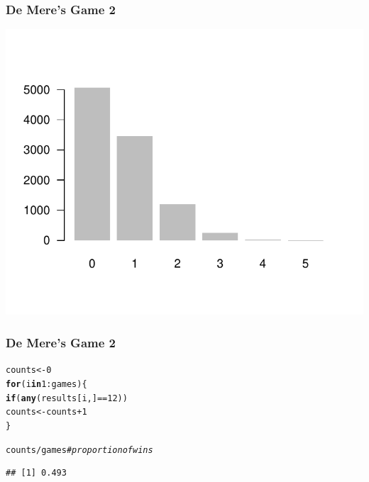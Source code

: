 \documentclass[12pt]{beamer}\usepackage[]{graphicx}\usepackage[]{color}
\makeatletter
\newcommand{\hlnum}[1]{\textcolor[rgb]{0.686,0.059,0.569}{#1}}%
\newcommand{\hlcom}[1]{\textcolor[rgb]{0.678,0.584,0.686}{\textit{#1}}}%
\newcommand{\hlopt}[1]{\textcolor[rgb]{0,0,0}{#1}}%
\newcommand{\hlstd}[1]{\textcolor[rgb]{0.345,0.345,0.345}{#1}}%
\newcommand{\hlkwa}[1]{\textcolor[rgb]{0.161,0.373,0.58}{\textbf{#1}}}%
\newcommand{\hlkwb}[1]{\textcolor[rgb]{0.69,0.353,0.396}{#1}}%
\newcommand{\hlkwd}[1]{\textcolor[rgb]{0.737,0.353,0.396}{\textbf{#1}}}%
\newenvironment{kframe}{%
 \def\at@end@of@kframe{}%
 \ifinner\ifhmode%
  \def\at@end@of@kframe{\end{minipage}}%
  \begin{minipage}{\columnwidth}%
 \fi\fi%
 \def\FrameCommand##1{\hskip\@totalleftmargin \hskip-\fboxsep
 \colorbox{shadecolor}{##1}\hskip-\fboxsep
     \hskip-\linewidth \hskip-\@totalleftmargin \hskip\columnwidth}%
 \MakeFramed {\advance\hsize-\width
   \@totalleftmargin\z@ \linewidth\hsize
   \@setminipage}}%
 {\par\unskip\endMakeFramed%
 \at@end@of@kframe}
\newenvironment{knitrout}{}{} %
\makeatother
\begin{document}
\begin{frame}[fragile]
\frametitle{De Mere's Game 2}

\begin{knitrout}\footnotesize
{}\color{fgcolor}

{\centering \includegraphics[width=.7\linewidth,height=.6\linewidth]{figure/unnamed-chunk-46-1} 

}



\end{knitrout}

\end{frame}


\begin{frame}[fragile]
\frametitle{De Mere's Game 2}

\begin{knitrout}\footnotesize
{}\color{fgcolor}\begin{kframe}
\begin{alltt}
\hlstd{counts} \hlkwb{<-} \hlnum{0}
\hlkwa{for} \hlstd{(i} \hlkwa{in} \hlnum{1}\hlopt{:}\hlstd{games) \{}
  \hlkwa{if} \hlstd{(}\hlkwd{any}\hlstd{(results[i, ]} \hlopt{==} \hlnum{12}\hlstd{))}
    \hlstd{counts} \hlkwb{<-} \hlstd{counts} \hlopt{+} \hlnum{1}
\hlstd{\}}

\hlstd{counts} \hlopt{/} \hlstd{games}  \hlcom{# proportion of wins}
\end{alltt}
\begin{verbatim}
## [1] 0.493
\end{verbatim}
\end{kframe}
\end{knitrout}

\end{frame}

\end{document}
